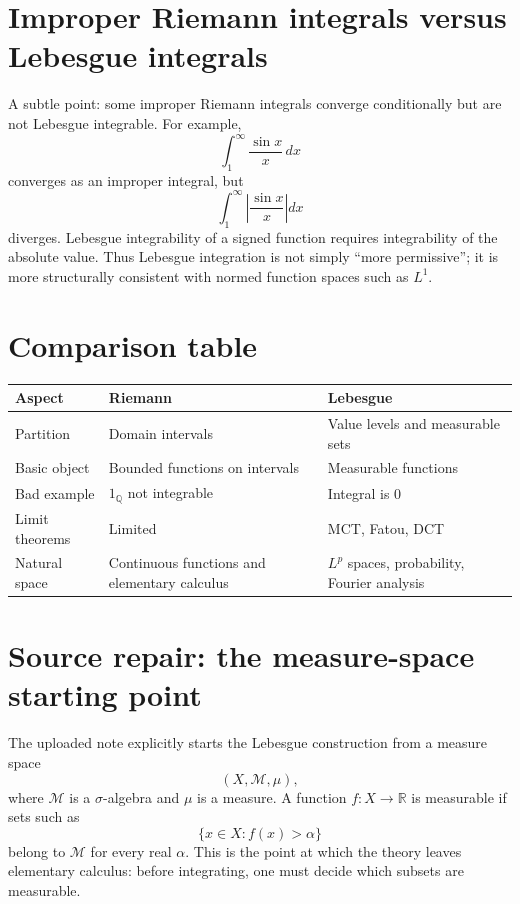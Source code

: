 \section{Improper Riemann integrals versus Lebesgue integrals}

A subtle point: some improper Riemann integrals converge conditionally but are not Lebesgue integrable.  For example,
\[
  \int_1^\infty \frac{\sin x}{x}\,dx
\]
converges as an improper integral, but
\[
  \int_1^\infty \left|\frac{\sin x}{x}\right|dx
\]
diverges.  Lebesgue integrability of a signed function requires integrability of the absolute value.  Thus Lebesgue integration is not simply “more permissive”; it is more structurally consistent with normed function spaces such as $L^1$.

\section{Comparison table}

\begin{center}
\small
\begin{tabularx}{\textwidth}{@{}lYY@{}}
\toprule
Aspect & Riemann & Lebesgue \\
\midrule
Partition & Domain intervals & Value levels and measurable sets \\
Basic object & Bounded functions on intervals & Measurable functions \\
Bad example & $1_{\mathbb Q}$ not integrable & Integral is $0$ \\
Limit theorems & Limited & MCT, Fatou, DCT \\
Natural space & Continuous functions and elementary calculus & $L^p$ spaces, probability, Fourier analysis \\
\bottomrule
\end{tabularx}
\end{center}


\section{Source repair: the measure-space starting point}

The uploaded note explicitly starts the Lebesgue construction from a measure space
\[
  (X,\mathcal M,\mu),
\]
where \(\mathcal M\) is a \(\sigma\)-algebra and \(\mu\) is a measure.  A function \(f:X\to\mathbb R\) is measurable if sets such as
\[
  \{x\in X:f(x)>\alpha\}
\]
belong to \(\mathcal M\) for every real \(\alpha\).  This is the point at which the theory leaves elementary calculus: before integrating, one must decide which subsets are measurable.

